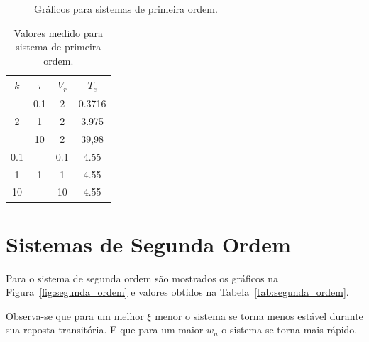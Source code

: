 \documentclass[a4paper]{article}
\begin{document}
\begin{figure}[h]
   \caption{Gráficos para sistemas de primeira ordem.}
   \label{fig:primeira_ordem}
\end{figure}

\begin{table}[h]
   \begin{center}
   \begin{tabular}{| c | c | c | c |}
      \hline
      \textbf{$k$} & \textbf{$\tau$} & \textbf{$V_r$} & \textbf{$T_e$} \\\hline
	\multirow{3}{*}{2}&	   0.1	     &	     2	      &	     0.3716    \\\cline{2-4}
	 	   &	   1	     &	     2	      &	     3.975     \\\cline{2-4}
	 	   &	   10	     &	     2	      &	     39,98     \\\hline
	 0.1	   &	   \multirow{3}{*}{1}	     &	   0.1	      &	     4.55     \\\cline{3-4} \cline{1-1}
	 1	   &	   	     &	   1	      &	     4.55     \\\cline{3-4} \cline{1-1}
	 10	   &	   	     &	   10	      &	     4.55     \\\hline
   \end{tabular}                                    
   \end{center}
   \caption{Valores medido para sistema de primeira ordem.}
   \label{tab:primeira_ordem}
\end{table}

\section{Sistemas de Segunda Ordem}

Para o sistema de segunda ordem são mostrados os gráficos na Figura~\ref{fig:segunda_ordem} e 
valores obtidos na Tabela~\ref{tab:segunda_ordem}.

Observa-se que para um melhor $\xi$ menor o sistema se torna menos estável durante sua
reposta transitória. E que para um maior $w_n$ o sistema se torna mais rápido.
\end{document}
